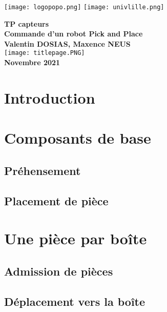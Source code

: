 \documentclass[oneside,a4paper,12pt]{article}
\begin{document}
	\begin{titlepage}
		\texttt{[image: logopopo.png]}
		\hspace*{\fill}
		\texttt{[image: univlille.png]}
		
		\begin{center}
			\vspace{1cm}
			\textbf{TP capteurs}\\
			\textbf{Commande d'un robot Pick and Place}\\
			\vspace{1cm}
			\textbf{Valentin DOSIAS, Maxence NEUS}\\
			\vspace{3cm}
			\texttt{[image: titlepage.PNG]}\\
			\vspace{\fill}
			\textbf{Novembre 2021}\\
		\end{center}
	\end{titlepage}
	
	\tableofcontents
	\newpage
	
	\section{Introduction}
	
	\section{Composants de base}
		\subsection{Préhensement}
		
		\subsection{Placement de pièce}
	
	\section{Une pièce par boîte}
		\subsection{Admission de pièces}
		
		\subsection{Déplacement vers la boîte}
	
\end{document}
